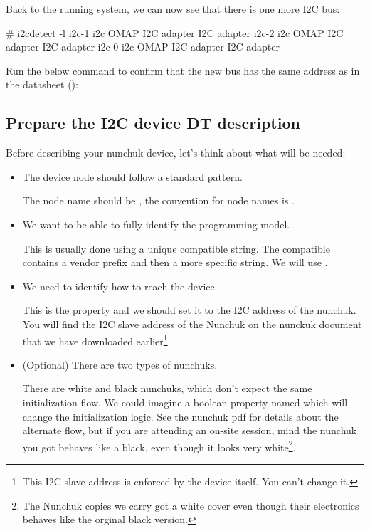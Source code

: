 Back to the running system, we can now see that there is one more
I2C bus:

\begin{bashinput}
# i2cdetect -l
i2c-1	i2c             OMAP I2C adapter                        I2C adapter
i2c-2	i2c             OMAP I2C adapter                        I2C adapter
i2c-0	i2c             OMAP I2C adapter                        I2C adapter
\end{bashinput}

Run the below command to confirm that the new bus has the same address
as in the datasheet ():


\subsection{Prepare the I2C device DT description}

Before describing your nunchuk device, let's think about what will be
needed:
\begin{itemize}
\item The device node should follow a standard pattern.

  The node name should be , the convention for node
  names is .

\item We want to be able to fully identify the programming model.

  This is usually done using a unique compatible string. The compatible
  contains a vendor prefix and then a more specific string. We will use
  .

\item We need to identify how to reach the device.

  This is the  property and we should set it to the I2C
  address of the nunchuk. You will find the I2C slave address of the
  Nunchuk on the nunckuk document that we have downloaded
  earlier\footnote{This I2C slave address is enforced by the device
    itself. You can't change it.}.

\item (Optional) There are two types of nunchuks.

  There are white and black nunchuks, which don't expect the same
  initialization flow. We could imagine a boolean property named
   which will change the initialization
  logic. See the nunchuk pdf for details about the alternate flow, but if you
  are attending an on-site session, mind the nunchuk you got behaves like a
  black, even though it looks very white\footnote{The Nunchuk copies we
  carry got a white cover even though their electronics behaves like the
  orginal black version.}.

\end{itemize}

